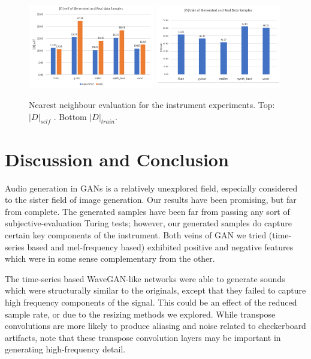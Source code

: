 \begin{figure}[htpb]
\centering
\includegraphics[width=0.49\textwidth]{D_self_gen_real_2.png}
\includegraphics[width=0.49\textwidth]{D_train_gen_real_2.png}
\caption{Nearest neighbour evaluation for the instrument experiments. Top: $|D|_{self}$ . Bottom $|D|_{train}$.}
\label{fig:instrument_nn}
\end{figure}


\section{Discussion and Conclusion}

Audio generation in GANs is a relatively unexplored field, especially considered to the sister field of image generation. Our results have been promising, but far from complete. The generated samples have been far from passing any sort of subjective-evaluation Turing tests; however, our generated samples do capture certain key components of the instrument. Both veins of GAN we tried (time-series based and mel-frequency based) exhibited positive and negative features which were in some sense complementary from the other.

The time-series based WaveGAN-like networks were able to generate sounds which were structurally similar to the originals, except that they failed to capture high frequency components of the signal. This could be an effect of the reduced sample rate, or due to the resizing methods we explored. While transpose convolutions are more likely to produce aliasing and noise related to checkerboard artifacts, \cite{donahue2018adversarial} note that these transpose convolution layers may be important in generating high-frequency detail.

